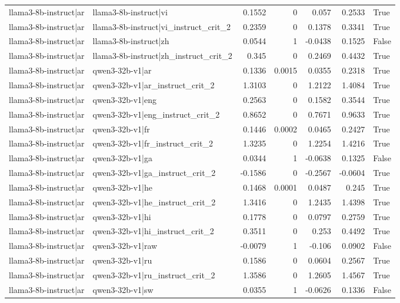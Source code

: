 \begin{table}
\begin{tabular}{l l r r r r l}
llama3-8b-instruct|ar & llama3-8b-instruct|vi & 0.1552 & 0 & 0.057 & 0.2533 & True \\
llama3-8b-instruct|ar & llama3-8b-instruct|vi_instruct_crit_2 & 0.2359 & 0 & 0.1378 & 0.3341 & True \\
llama3-8b-instruct|ar & llama3-8b-instruct|zh & 0.0544 & 1 & -0.0438 & 0.1525 & False \\
llama3-8b-instruct|ar & llama3-8b-instruct|zh_instruct_crit_2 & 0.345 & 0 & 0.2469 & 0.4432 & True \\
llama3-8b-instruct|ar & qwen3-32b-v1|ar & 0.1336 & 0.0015 & 0.0355 & 0.2318 & True \\
llama3-8b-instruct|ar & qwen3-32b-v1|ar_instruct_crit_2 & 1.3103 & 0 & 1.2122 & 1.4084 & True \\
llama3-8b-instruct|ar & qwen3-32b-v1|eng & 0.2563 & 0 & 0.1582 & 0.3544 & True \\
llama3-8b-instruct|ar & qwen3-32b-v1|eng_instruct_crit_2 & 0.8652 & 0 & 0.7671 & 0.9633 & True \\
llama3-8b-instruct|ar & qwen3-32b-v1|fr & 0.1446 & 0.0002 & 0.0465 & 0.2427 & True \\
llama3-8b-instruct|ar & qwen3-32b-v1|fr_instruct_crit_2 & 1.3235 & 0 & 1.2254 & 1.4216 & True \\
llama3-8b-instruct|ar & qwen3-32b-v1|ga & 0.0344 & 1 & -0.0638 & 0.1325 & False \\
llama3-8b-instruct|ar & qwen3-32b-v1|ga_instruct_crit_2 & -0.1586 & 0 & -0.2567 & -0.0604 & True \\
llama3-8b-instruct|ar & qwen3-32b-v1|he & 0.1468 & 0.0001 & 0.0487 & 0.245 & True \\
llama3-8b-instruct|ar & qwen3-32b-v1|he_instruct_crit_2 & 1.3416 & 0 & 1.2435 & 1.4398 & True \\
llama3-8b-instruct|ar & qwen3-32b-v1|hi & 0.1778 & 0 & 0.0797 & 0.2759 & True \\
llama3-8b-instruct|ar & qwen3-32b-v1|hi_instruct_crit_2 & 0.3511 & 0 & 0.253 & 0.4492 & True \\
llama3-8b-instruct|ar & qwen3-32b-v1|raw & -0.0079 & 1 & -0.106 & 0.0902 & False \\
llama3-8b-instruct|ar & qwen3-32b-v1|ru & 0.1586 & 0 & 0.0604 & 0.2567 & True \\
llama3-8b-instruct|ar & qwen3-32b-v1|ru_instruct_crit_2 & 1.3586 & 0 & 1.2605 & 1.4567 & True \\
llama3-8b-instruct|ar & qwen3-32b-v1|sw & 0.0355 & 1 & -0.0626 & 0.1336 & False \\

\end{tabular}
\end{table}

